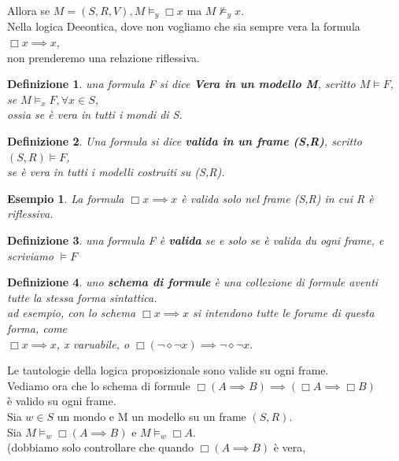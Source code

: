 \documentclass[a4paper,12pt]{article}
\theoremstyle{def}
\newtheorem*{definition}{Definizione}
\theoremstyle{prop}
\theoremstyle{esempio}
\newtheorem*{example}{Esempio}
\theoremstyle{dimostrazione}
\theoremstyle{teo}
\theoremstyle{osservazione}
\begin{document}
Allora se \(M = (S, R, V), M \vDash_y \Box x\) ma \(M \nvDash_y x\).\\
Nella logica Deeontica, dove non vogliamo che sia sempre vera la formula \(\Box x \implies x\),\\
non prenderemo una relazione riflessiva.\\
\begin{definition}
	una formula F si dice \textbf{Vera in un modello M}, scritto \textbf{\(M \vDash F\)}, se \(M \vDash_x F, \forall x \in S\),\\
	ossia se è vera in tutti i mondi di S.\\
\end{definition}
\begin{definition}
	Una formula si dice \textbf{valida in un frame (S,R)}, scritto \textbf{\((S,R) \vDash F\)},\\
	se è vera in tutti i modelli costruiti su (S,R).\\
\end{definition}
\begin{example}
	La formula \(\Box x \implies x\) è valida solo nel frame (S,R) in cui R è riflessiva.
\end{example}
\begin{definition}
	una formula F è \textbf{valida} se e solo se è valida du ogni frame, e scriviamo \textbf{\(\vDash F\)}\\
\end{definition}
\begin{definition}
	uno \textbf{schema di formule} è una collezione di formule aventi tutte la stessa forma sintattica.\\
	ad esempio, con lo schema \(\Box x \implies x\) si intendono tutte le forume di questa forma, come\\
	\(\Box x \implies x\), x varuabile, o \(\Box (\neg \diamond \neg x) \implies \neg \diamond \neg x\).
\end{definition}
Le tautologie della logica proposizionale sono valide su ogni frame.\\
Vediamo ora che lo schema di formule \(\Box (A \implies B) \implies (\Box A \implies \Box B)\) \\
è valido su ogni frame.\\
Sia \(w \in S\) un mondo e M un modello su un frame \((S,R)\).\\
Sia \(M \vDash_w \Box (A \implies B)\) e \(M \vDash_w \Box A\).\\
(dobbiamo solo controllare che quando \(\Box ( A \implies B )\) è vera,\\
\end{document}
